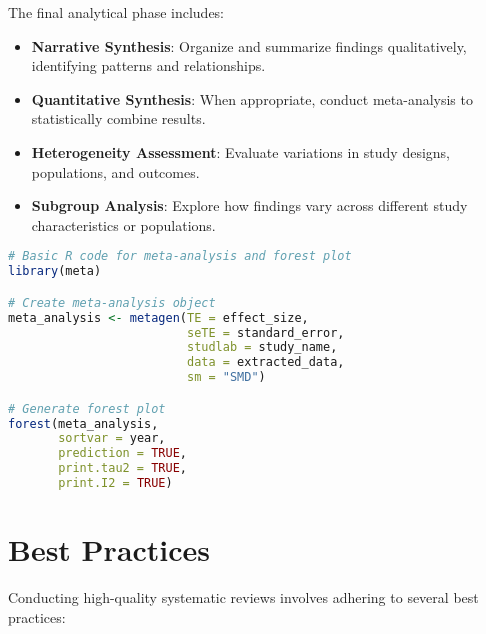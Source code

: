 The final analytical phase includes:

\begin{itemize}
    \item \textbf{Narrative Synthesis}: Organize and summarize findings qualitatively, identifying patterns and relationships.
    \item \textbf{Quantitative Synthesis}: When appropriate, conduct meta-analysis to statistically combine results.
    \item \textbf{Heterogeneity Assessment}: Evaluate variations in study designs, populations, and outcomes.
    \item \textbf{Subgroup Analysis}: Explore how findings vary across different study characteristics or populations.
\end{itemize}


\begin{commandbox}
\begin{lstlisting}[language=R]
# Basic R code for meta-analysis and forest plot
library(meta)

# Create meta-analysis object
meta_analysis <- metagen(TE = effect_size,
                         seTE = standard_error,
                         studlab = study_name,
                         data = extracted_data,
                         sm = "SMD")

# Generate forest plot
forest(meta_analysis,
       sortvar = year,
       prediction = TRUE,
       print.tau2 = TRUE,
       print.I2 = TRUE)
\end{lstlisting}
\end{commandbox}


\section{Best Practices}

Conducting high-quality systematic reviews involves adhering to several best practices:

